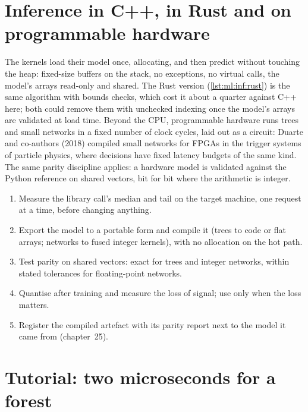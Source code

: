 \section{Inference in C++, in Rust and on programmable hardware}

The kernels load their model once, allocating, and then predict without touching the heap: fixed-size buffers on the stack, no
exceptions, no virtual calls, the model's arrays read-only and shared. The Rust version (\cref{lst:ml:inf:rust}) is the same
algorithm with bounds checks, which cost it about a quarter against C++ here; both could remove them with unchecked indexing
once the model's arrays are validated at load time. Beyond the CPU, programmable hardware runs trees and small networks in a
fixed number of clock cycles, laid out as a circuit: Duarte and co-authors (2018) compiled small networks for FPGAs in the
trigger systems of particle physics, where decisions have fixed latency budgets of the same kind. The same parity discipline
applies: a hardware model is validated against the Python reference on shared vectors, bit for bit where the arithmetic is
integer.

\begin{method}\label{met:ml:inf:method}
\begin{enumerate}
\item Measure the library call's median and tail on the target machine, one request at a time, before changing anything.
\item Export the model to a portable form and compile it (trees to code or flat arrays; networks to fused integer kernels),
with no allocation on the hot path.
\item Test parity on shared vectors: exact for trees and integer networks, within stated tolerances for floating-point
networks.
\item Quantise after training and measure the loss of signal; use  only when the loss matters.
\item Register the compiled artefact with its parity report next to the model it came from (chapter~25).
\end{enumerate}
\end{method}

\section{Tutorial: two microseconds for a forest}\label{tut:ml:low-latency-inference:tut}

